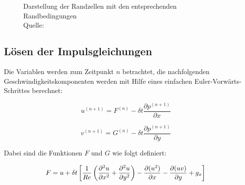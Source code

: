 		\begin{figure}[h]
			\center
			\caption{Darstellung der Randzellen mit den entsprechenden Randbedingungen \\ Quelle: \cite{nsfd} }
			\label{fig:Randzellen}
		\end{figure}



	\subsection{Lösen der Impulsgleichungen} %
	\label{sub:l_sen_der_impulsgleichungen}

		Die Variablen werden zum Zeitpunkt $n$ betrachtet, die nachfolgenden Geschwindigkeitskomponenten werden mit Hilfe eines einfachen Euler-Vorwärts-Schrittes berechnet:

		\[ u^{(n+1)} = F^{(n)} - \delta t \frac{\partial p^{(n+1)}}{\partial x} \]

		\[ v^{(n+1)} = G^{(n)} - \delta t \frac{\partial p^{(n+1)}}{\partial y} \]

		Dabei sind die Funktionen $F$ und $G$ wie folgt definiert:

		\[ F = u + \delta t \left[  \frac{1}{Re} \left(  \frac{\partial ^{2} u}{\partial x ^{2}} + \frac{\partial ^{2} u}{\partial y ^{2}} \right) 
		- \frac{ \partial (u^{2}) }{ \partial x} - \frac{ \partial (uv) }{ \partial y} + g_x  \right] \]

